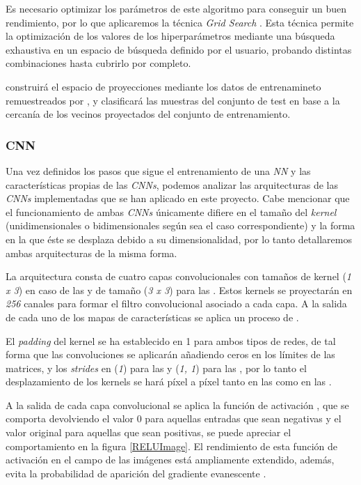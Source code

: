             Es necesario optimizar los parámetros de este algoritmo para conseguir un buen rendimiento, por lo que aplicaremos la técnica \textit{Grid Search} \cite{GridSearchSklearnLibrary}. Esta técnica permite la optimización de los valores de los hiperparámetros mediante una búsqueda exhaustiva en un espacio de búsqueda definido por el usuario, probando distintas combinaciones hasta cubrirlo por completo. 

             construirá el espacio de proyecciones mediante los datos de entrenamineto remuestreados por , y clasificará las muestras del conjunto de test en base a la cercanía de los vecinos proyectados del conjunto de entrenamiento.


        \subsubsection{CNN}

            Una vez definidos los pasos que sigue el entrenamiento de una \textit{NN} y las características propias de las \textit{CNNs}, podemos analizar las arquitecturas de las \textit{CNNs} implementadas que se han aplicado en este proyecto. Cabe mencionar que el funcionamiento de ambas \textit{CNNs} únicamente difiere en el tamaño del \textit{kernel} (unidimensionales o bidimensionales según sea el caso correspondiente) y la forma en la que éste se desplaza debido a su dimensionalidad, por lo tanto detallaremos ambas arquitecturas de la misma forma.

            La arquitectura consta de cuatro capas convolucionales con tamaños de kernel (\textit{1 x 3}) en caso de las  y de tamaño (\textit{3 x 3}) para las . Estos kernels se proyectarán en \textit{256} canales para formar el filtro convolucional asociado a cada capa. A la salida de cada uno de los mapas de características se aplica un proceso de .

            El \textit{padding} del kernel se ha establecido en 1 para ambos tipos de redes, de tal forma que las convoluciones se aplicarán añadiendo ceros en los límites de las matrices, y los \textit{strides} en (\textit{1}) para las  y (\textit{1, 1}) para las , por lo tanto el desplazamiento de los kernels se hará píxel a píxel tanto en las  como en las .

            A la salida de cada capa convolucional se aplica la función de activación , que se comporta devolviendo el valor $0$ para aquellas entradas que sean negativas y el valor original para aquellas que sean positivas, se puede apreciar el comportamiento en la figura \eqref{RELUImage}. El rendimiento de esta función de activación en el campo de las imágenes está ampliamente extendido, además, evita la probabilidad de aparición del gradiente evanescente \cite{GradientVanishingRelu}.

